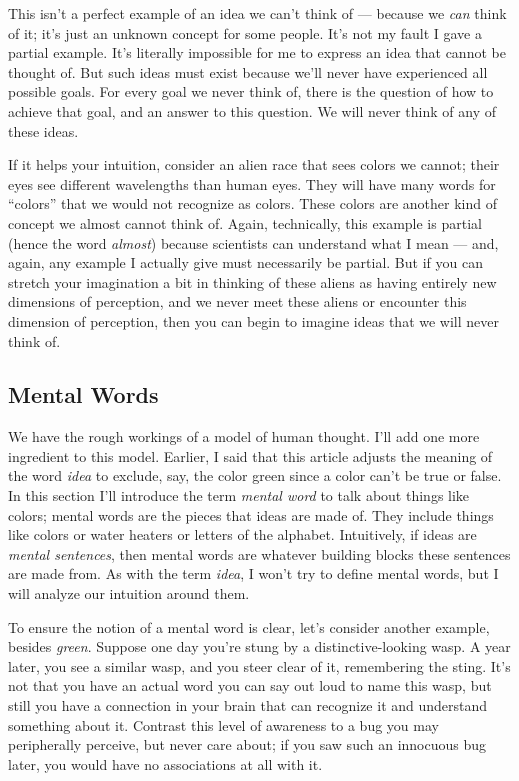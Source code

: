 \documentclass[11pt, oneside]{article}   	%
\begin{document}
This isn't a perfect example of an idea we can't think of --- because we {\em
can} think of it; it's just an unknown concept for some people.
It's not my fault I
gave a partial example.
It's literally impossible for me to express an idea that
cannot be thought of.
But such ideas must exist because we'll never
have experienced all possible goals.
For every goal we never think of,
there is the question of how to achieve that goal, and an answer to this
question. We will never think of any of these ideas.

If it helps your intuition, consider an alien race that sees colors we cannot;
their eyes see different wavelengths than human eyes.
They will have many words for ``colors''
that we would not recognize as colors. These colors are another kind of concept
we almost cannot think of.
Again, technically, this example is
partial (hence the word {\em almost})
because scientists can understand what I mean --- and, again, any
example I actually give must necessarily be partial. But if you can stretch your
imagination a bit in thinking of these aliens as having entirely new dimensions
of perception, and we never meet these aliens or encounter this dimension of
perception, then you can begin to imagine ideas that we will never think of.

\subsection{Mental Words}\label{s_mental_words}

We have the rough workings of a model of human thought.
I'll add one more
ingredient to this model.
Earlier, I said that this article adjusts the meaning of the word
{\em idea} to exclude, say, the color green since a color
can't be true or false.
In this section I'll introduce the term {\em mental word} to talk about
things like colors;
mental words are
the pieces that ideas are made of.
They include things like
colors or water heaters or letters of the alphabet.
Intuitively, if
ideas are {\em mental sentences}, then mental words are whatever building
blocks these sentences are made from.
As with the term {\em idea}, I won't try to define mental words,
but I will analyze our intuition around them.

To ensure the notion of a mental word is clear, let's consider another example,
besides {\em green}.
Suppose one day you're stung
by a distinctive-looking wasp.
A year later, you see a similar wasp, and you
steer clear of it, remembering the sting.
It's not that you have an actual word you can say out loud to name this wasp,
but still you have a connection in your brain that can recognize it and
understand something about it.
Contrast this level of awareness to a bug you may peripherally perceive, but
never care about; if you saw such an innocuous bug later, you would have no
associations at all with it.
\end{document}
